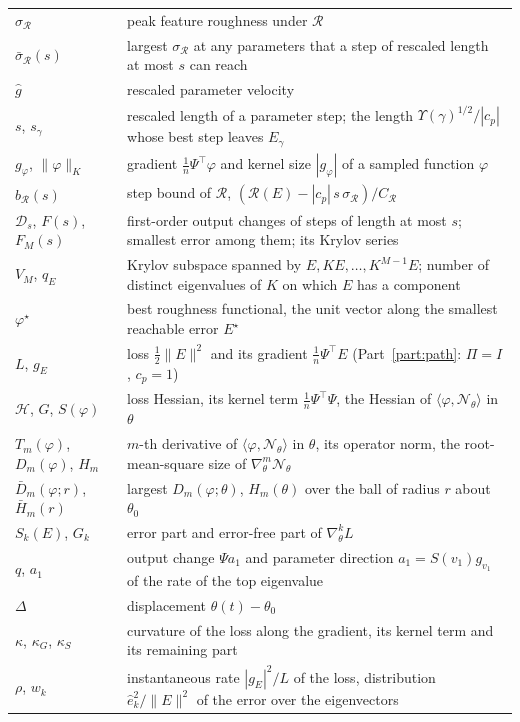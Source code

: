 \documentclass[11pt]{article}
\theoremstyle{definition}
\theoremstyle{remark}
\newcommand{\Net}{\mathcal{N}_\theta}    %
\newcommand{\Rgh}{\mathcal{R}}           %
\newcommand{\sR}{\sigma_{\Rgh}}
\newcommand{\CR}{C_{\Rgh}}
\newcommand{\ip}[2]{\langle #1,#2\rangle}
\newcommand{\Hess}{\mathcal{H}}          %
\begin{document}
\begin{table}[H]
\begin{tabular}{@{}p{}p{}@{}}
$\sR$ & peak feature roughness under $\Rgh$ \\
$\bar\sigma_\Rgh(s)$ & largest $\sR$ at any parameters that a step of rescaled length at most $s$ can reach \\
$\hat g$ & rescaled parameter velocity \\
$s$, $s_\gamma$ & rescaled length of a parameter step; the length $\Upsilon(\gamma)^{1/2}/|c_p|$ whose best step leaves $E_\gamma$ \\
$g_\varphi$, $\|\varphi\|_K$ & gradient $\frac1n\Psi^\top\varphi$ and kernel size $|g_\varphi|$ of a sampled function $\varphi$ \\
$b_\Rgh(s)$ & step bound of $\Rgh$, $(\Rgh(E) - |c_p|\,s\,\sR)/\CR$ \\
$\mathcal{D}_s$, $F(s)$, $F_M(s)$ & first-order output changes of steps of length at most $s$; smallest error among them; its Krylov series \\
$V_M$, $q_E$ & Krylov subspace spanned by $E, KE, \dots, K^{M-1}E$; number of distinct eigenvalues of $K$ on which $E$ has a component \\
$\varphi^\star$ & best roughness functional, the unit vector along the smallest reachable error $E^\star$ \\
\midrule
$L$, $g_E$ & loss $\frac12\|E\|^2$ and its gradient $\frac1n\Psi^\top E$ (Part~\ref{part:path}: $\Pi = I$, $c_p = 1$) \\
$\Hess$, $G$, $S(\varphi)$ & loss Hessian, its kernel term $\frac1n\Psi^\top\Psi$, the Hessian of $\ip{\varphi}{\Net}$ in $\theta$ \\
$T_m(\varphi)$, $D_m(\varphi)$, $H_m$ & $m$-th derivative of $\ip{\varphi}{\Net}$ in $\theta$, its operator norm, the root-mean-square size of $\nabla^m_\theta\Net$ \\
$\bar D_m(\varphi;r)$, $\bar H_m(r)$ & largest $D_m(\varphi;\theta)$, $H_m(\theta)$ over the ball of radius $r$ about $\theta_0$ \\
$S_k(E)$, $G_k$ & error part and error-free part of $\nabla^k_\theta L$ \\
$q$, $a_1$ & output change $\Psi a_1$ and parameter direction $a_1 = S(v_1)g_{v_1}$ of the rate of the top eigenvalue \\
$\Delta$ & displacement $\theta(t) - \theta_0$ \\
$\kappa$, $\kappa_G$, $\kappa_S$ & curvature of the loss along the gradient, its kernel term and its remaining part \\
$\rho$, $w_k$ & instantaneous rate $|g_E|^2/L$ of the loss, distribution $\hat e_k^2/\|E\|^2$ of the error over the eigenvectors \\

\end{tabular}
\end{table}
\end{document}
